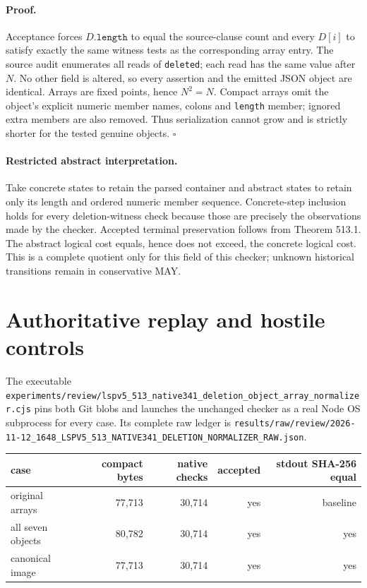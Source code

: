 \documentclass[11pt]{article}
\begin{document}
\paragraph{Proof.}
Acceptance forces $D.\texttt{length}$ to equal the source-clause count and every
$D[i]$ to satisfy exactly the same witness tests as the corresponding array
entry.  The source audit enumerates all reads of \texttt{deleted}; each read has
the same value after $N$.  No other field is altered, so every assertion and
the emitted JSON object are identical.  Arrays are fixed points, hence
$N^2=N$.  Compact arrays omit the object's explicit numeric member names,
colons and \texttt{length} member; ignored extra members are also removed.
Thus serialization cannot grow and is strictly shorter for the tested genuine
objects. \hfill$\square$

\paragraph{Restricted abstract interpretation.}
Take concrete states to retain the parsed container and abstract states to
retain only its length and ordered numeric member sequence.  Concrete-step
inclusion holds for every deletion-witness check because those are precisely
the observations made by the checker.  Accepted terminal preservation follows
from Theorem 513.1.  The abstract logical cost equals, hence does not exceed,
the concrete logical cost.  This is a complete quotient only for this field of
this checker; unknown historical transitions remain in conservative MAY.

\section{Authoritative replay and hostile controls}

The executable
\texttt{experiments/review/lspv5\_513\_native341\_deletion\_object\_array\_normalizer.cjs}
pins both Git blobs and launches the unchanged checker as a real Node OS
subprocess for every case.  Its complete raw ledger is
\texttt{results/raw/review/2026-11-12\_1648\_LSPV5\_513\_NATIVE341\_DELETION\_NORMALIZER\_RAW.json}.

\begin{center}
\begin{tabular}{lrrrr}
\toprule
case & compact bytes & native checks & accepted & stdout SHA-256 equal\\
\midrule
original arrays & 77,713 & 30,714 & yes & baseline\\
all seven objects & 80,782 & 30,714 & yes & yes\\
canonical image & 77,713 & 30,714 & yes & yes\\
\bottomrule
\end{tabular}
\end{center}
\end{document}
